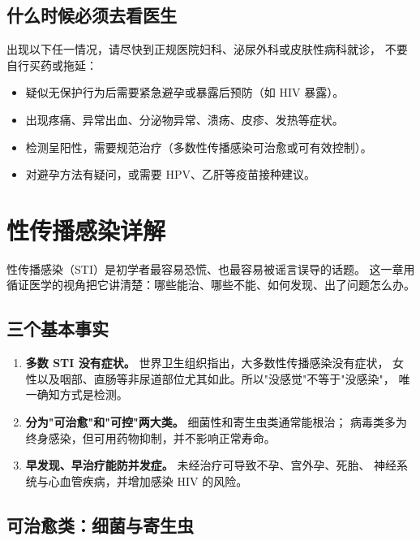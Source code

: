 \documentclass[12pt,UTF8,openany]{ctexbook}
\begin{document}
\section{什么时候必须去看医生}

出现以下任一情况，请尽快到正规医院妇科、泌尿外科或皮肤性病科就诊，
不要自行买药或拖延：

\begin{itemize}
  \item 疑似无保护行为后需要紧急避孕或暴露后预防（如 HIV 暴露）。
  \item 出现疼痛、异常出血、分泌物异常、溃疡、皮疹、发热等症状。
  \item 检测呈阳性，需要规范治疗（多数性传播感染可治愈或可有效控制）。
  \item 对避孕方法有疑问，或需要 HPV、乙肝等疫苗接种建议。
\end{itemize}

\chapter{性传播感染详解}
\label{chap:sti}

性传播感染（STI）是初学者最容易恐慌、也最容易被谣言误导的话题。
这一章用循证医学的视角把它讲清楚：哪些能治、哪些不能、如何发现、出了问题怎么办。

\section{三个基本事实}

\begin{enumerate}[leftmargin=2em,itemsep=0.3em]
  \item \textbf{多数 STI 没有症状。} 世界卫生组织指出，大多数性传播感染没有症状，
        女性以及咽部、直肠等非尿道部位尤其如此。所以"没感觉"不等于"没感染"，
        唯一确知方式是检测。
  \item \textbf{分为"可治愈"和"可控"两大类。} 细菌性和寄生虫类通常能根治；
        病毒类多为终身感染，但可用药物抑制，并不影响正常寿命。
  \item \textbf{早发现、早治疗能防并发症。} 未经治疗可导致不孕、宫外孕、死胎、
        神经系统与心血管疾病，并增加感染 HIV 的风险。
\end{enumerate}

\section{可治愈类：细菌与寄生虫}
\end{document}
